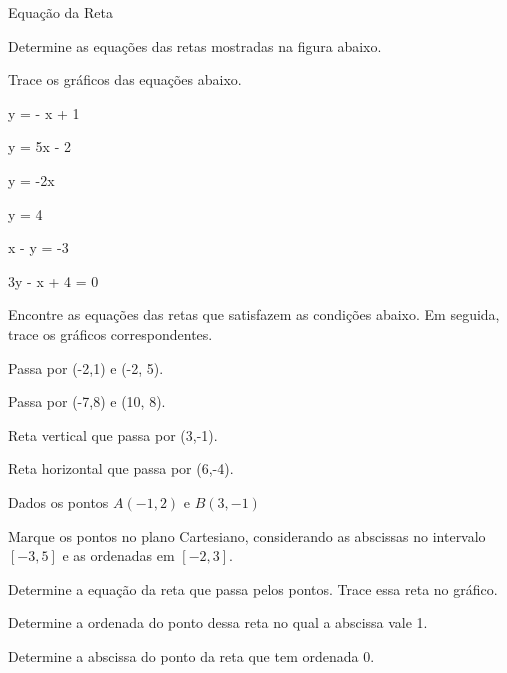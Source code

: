 \begin{exercicios}{Equação da Reta}
    \begin{exercicio}
        Determine as equações das retas mostradas na figura abaixo.
    \end{exercicio}
    
    \begin{exercicio}
        Trace os gráficos das equações abaixo.
	    \begin{mathlist}[2]
	    	\item y = - x + 1
	    	\item y = 5x - 2
	    	\item y = -2x
	    	\item y = 4
	    	\item x - y = -3
	    	\item 3y - x + 4 = 0
	    \end{mathlist}        
    \end{exercicio}
    
    \begin{exercicio}
        Encontre as equações das retas que satisfazem as condições abaixo. Em seguida, trace os gráficos correspondentes.
        \begin{alphalist}
            \item Passa por (-2,1) e (-2, 5).
            \item Passa por (-7,8) e (10, 8).
            \item Reta vertical que passa por (3,-1).
            \item Reta horizontal que passa por (6,-4).
        \end{alphalist}
    \end{exercicio}
    
    \begin{exercicio}
        Dados os pontos $A(-1,2)$ e $B(3,-1)$
        \begin{alphalist}
            \item Marque os pontos no plano Cartesiano, considerando as abscissas no intervalo $[-3,5]$ e as ordenadas em $[-2, 3]$.
            \item Determine a equação da reta que passa pelos pontos. Trace essa reta no gráfico.
            \item Determine a ordenada do ponto dessa reta no qual a abscissa vale 1.
            \item Determine a abscissa do ponto da reta que tem ordenada 0.
        \end{alphalist}
    \end{exercicio}
    
\end{exercicios}


